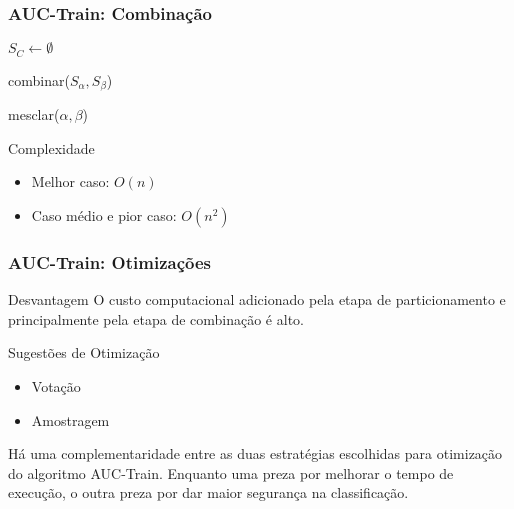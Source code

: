 \begin{frame}
    \frametitle{AUC-Train: Combinação}

    \begin{function}[H]
        $S_C \gets \emptyset$\;



        \caption{combinar($S_{\alpha}, S_{\beta}$)}
    \end{function}

    \begin{function}[H]

        \caption{mesclar($\alpha, \beta$)}
    \end{function}

    \begin{block}{Complexidade}
        \begin{itemize}
            \item Melhor caso: $O(n)$
            \item Caso médio e pior caso: $O(n^2)$
        \end{itemize}
    \end{block}
\end{frame}

\begin{frame}
    \frametitle{AUC-Train: Otimizações}

    \begin{block}{Desvantagem}
        O custo computacional adicionado pela etapa de particionamento e principalmente pela etapa de combinação é alto.
    \end{block}

    \begin{block}{Sugestões de Otimização}
        \begin{itemize}
            \item Votação
            \item Amostragem
        \end{itemize}
    \end{block}

    Há uma complementaridade entre as duas estratégias escolhidas para otimização do algoritmo AUC-Train. Enquanto uma preza por melhorar o tempo de execução, o outra preza por dar maior segurança na classificação.
\end{frame}

